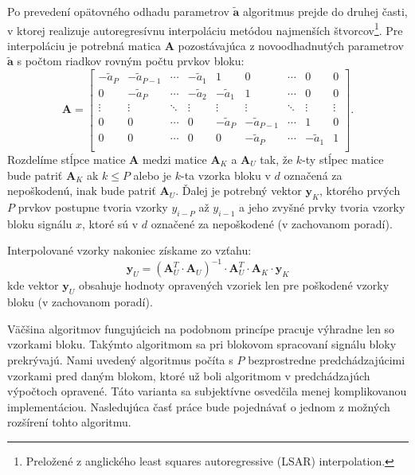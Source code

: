 Po prevedení opätovného odhadu parametrov $\mathbf{\tilde{a}}$ algoritmus prejde do druhej časti, v ktorej realizuje autoregresívnu interpoláciu metódou najmenších štvorcov\footnote{Preložené z anglického least squares autoregressive (LSAR) interpolation.}. Pre interpoláciu je potrebná matica $\mathbf{A}$ pozostávajúca z novoodhadnutých parametrov $\mathbf{\tilde{a}}$ s počtom riadkov rovným počtu prvkov bloku:
$$\mathbf{A}=\begin{bmatrix}
  -\tilde{a}_P & -\tilde{a}_{P-1} & \cdots & -\tilde{a}_1 & 1 & 0 & \cdots & 0 & 0\\
  0 & -\tilde{a}_P & \cdots & -\tilde{a}_2 & -\tilde{a}_1 & 1 & \cdots & 0 & 0\\
  \vdots & \vdots & \ddots &   \vdots & \vdots & \vdots & \ddots & \vdots & \vdots\\
  0 & 0 & \cdots & 0 & -\tilde{a}_P & -\tilde{a}_{P-1} & \cdots & 1 & 0\\
  0 & 0 & \cdots & 0 & 0 & -\tilde{a}_P & \cdots & -\tilde{a}_1 & 1\\
\end{bmatrix}.$$
Rozdelíme stĺpce matice $\mathbf{A}$ medzi matice $\mathbf{A}_{K}$ a $\mathbf{A}_{U}$ tak, že $k$-ty stĺpec matice bude patriť $\mathbf{A}_{K}$ ak $k \leq P$ alebo je $k$-ta vzorka bloku v $d$ označená za nepoškodenú, inak bude patriť $\mathbf{A}_{U}$. Ďalej je potrebný vektor $\mathbf{y}_{K}$, ktorého prvých $P$ prvkov postupne tvoria vzorky $y_{i-P}$ až $y_{i-1}$ a jeho zvyšné prvky tvoria vzorky bloku signálu $x$, ktoré sú v $d$ označené za nepoškodené (v zachovanom poradí).

Interpolované vzorky nakoniec získame zo vzťahu:
$$\mathbf{y}_{U}=(\mathbf{A}_{U}^{T} \cdot \mathbf{A}_{U})^{-1} \cdot \mathbf{A}_{U}^{T} \cdot \mathbf{A}_{K} \cdot \mathbf{y}_{K}$$ 
kde vektor $\mathbf{y}_{U}$ obsahuje hodnoty opravených vzoriek len pre poškodené vzorky bloku (v zachovanom poradí).

Väčšina algoritmov fungujúcich na podobnom princípe pracuje výhradne len so vzorkami bloku. Takýmto algoritmom sa pri blokovom spracovaní signálu bloky prekrývajú. Nami uvedený algoritmus počíta s $P$ bezprostredne predchádzajúcimi vzorkami pred daným blokom, ktoré už boli algoritmom v predchádzajúch výpočtoch opravené. Táto varianta sa subjektívne osvedčila menej komplikovanou implementáciou. Nasledujúca časť práce bude pojednávať o jednom z možných rozšírení tohto algoritmu.


